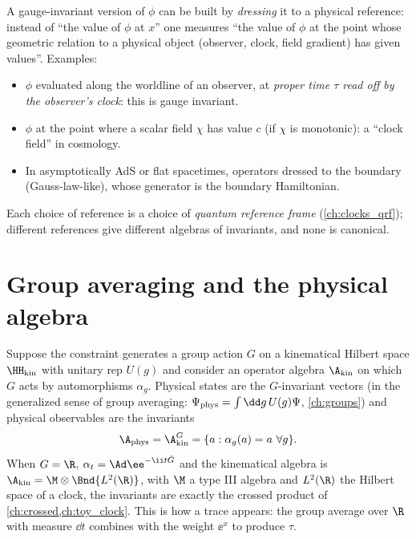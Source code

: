 A gauge-invariant version of $\phi$ can be built by \emph{dressing} it to a physical reference: instead of ``the value of $\phi$ at $x$'' one measures ``the value of $\phi$ at the point whose geometric relation to a physical object (observer, clock, field gradient) has given values''. Examples:
\begin{itemize}
\item $\phi$ evaluated along the worldline of an observer, at \emph{proper time $\tau$ read off by the observer's clock}: this is gauge invariant.
\item $\phi$ at the point where a scalar field $\chi$ has value $c$ (if $\chi$ is monotonic): a ``clock field'' in cosmology.
\item In asymptotically AdS or flat spacetimes, operators dressed to the boundary (Gauss-law-like), whose generator is the boundary Hamiltonian.
\end{itemize}
Each choice of reference is a choice of \emph{quantum reference frame} (\cref{ch:clocks_qrf}); different references give different algebras of invariants, and none is canonical.

\section{Group averaging and the physical algebra}

Suppose the constraint generates a group action $G$ on a kinematical Hilbert space $\HH_{\rm kin}$ with unitary rep $U(g)$ and consider an operator algebra $\A_{\rm kin}$ on which $G$ acts by automorphisms $\alpha_g$. Physical states are the $G$-invariant vectors (in the generalized sense of group averaging: $\Psi_{\rm phys}=\int\dd g\,U(g)\Psi$, \cref{ch:groups}) and physical observables are the invariants
\begin{equation}
\A_{\rm phys}=\A_{\rm kin}^{G}=\{a:\alpha_g(a)=a\ \forall g\}.
\end{equation}
When $G=\R$, $\alpha_t=\Ad\ee^{-\ii t\hat G}$ and the kinematical algebra is $\A_{\rm kin}=\M\otimes\Bnd{L^2(\R)}$, with $\M$ a type III algebra and $L^2(\R)$ the Hilbert space of a clock, the invariants are exactly the crossed product of \cref{ch:crossed,ch:toy_clock}. This is how a trace appears: the group average over $\R$ with measure $\dd t$ combines with the weight $\ee^{x}$ to produce $\tau$.

